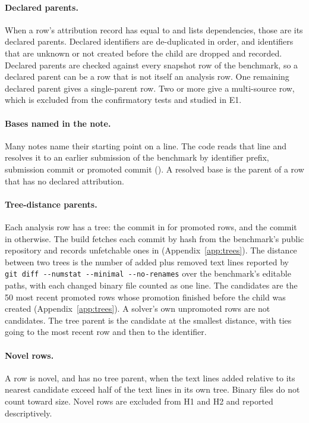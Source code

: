 \paragraph{Declared parents.}
When a row's attribution record has  equal to  and lists dependencies, those are its declared parents.
Declared identifiers are de-duplicated in order, and identifiers that are unknown or not created before the child are dropped and recorded.
Declared parents are checked against every snapshot row of the benchmark, so a declared parent can be a row that is not itself an analysis row.
One remaining declared parent gives a single-parent row.
Two or more give a multi-source row, which is excluded from the confirmatory tests and studied in E1.

\paragraph{Bases named in the note.}
Many notes name their starting point on a  line.
The code reads that line and resolves it to an earlier submission of the benchmark by identifier prefix, submission commit or promoted commit ().
A resolved base is the parent of a row that has no declared attribution.

\paragraph{Tree-distance parents.}
Each analysis row has a tree: the commit in  for promoted rows, and the commit in  otherwise.
The build fetches each commit by hash from the benchmark's public repository and records unfetchable ones in  (Appendix~\ref{app:trees}).
The distance between two trees is the number of added plus removed text lines reported by \texttt{git diff -{}-numstat -{}-minimal -{}-no-renames} over the benchmark's editable paths, with each changed binary file counted as one line.
The candidates are the 50 most recent promoted rows whose promotion finished before the child was created (Appendix~\ref{app:trees}). A solver's own unpromoted rows are not candidates.
The tree parent is the candidate at the smallest distance, with ties going to the most recent row and then to the identifier.

\paragraph{Novel rows.}
A row is novel, and has no tree parent, when the text lines added relative to its nearest candidate exceed half of the text lines in its own tree.
Binary files do not count toward size.
Novel rows are excluded from H1 and H2 and reported descriptively.

